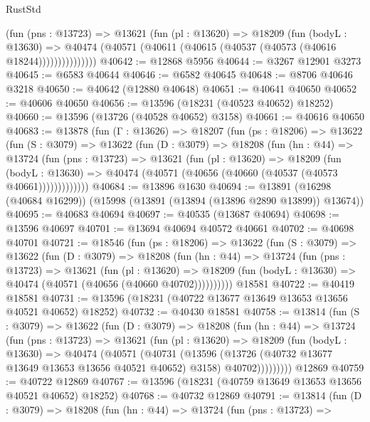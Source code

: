 \begin{lexlean}{RustStd}
\begin{coremodule}
                (fun (pns : @13723) =>
                @13621
                  (fun (pl : @13620) =>
                  @18209
                    (fun (bodyL : @13630) =>
                    @40474 (@40571 (@40611 (@40615 (@40537 (@40573 (@40616 @18244)))))))))))))))
@40642 := @12868 @5956
@40644 := @3267 @12901 @3273
@40645 := @6583 @40644
@40646 := @6582 @40645
@40648 := @8706 @40646 @3218
@40650 := @40642 (@12880 @40648)
@40651 := @40641 @40650
@40652 := @40606 @40650
@40656 := @13596 (@18231 (@40523 @40652) @18252)
@40660 := @13596 (@13726 (@40528 @40652) @3158)
@40661 := @40616 @40650
@40683 := @13878
    (fun (Γ : @13626) =>
    @18207
      (fun (ps : @18206) =>
      @13622
        (fun (S : @3079) =>
        @13622
          (fun (D : @3079) =>
          @18208
            (fun (hn : @44) =>
            @13724
              (fun (pns : @13723) =>
              @13621
                (fun (pl : @13620) =>
                @18209
                  (fun (bodyL : @13630) =>
                  @40474 (@40571 (@40656 (@40660 (@40537 (@40573 @40661)))))))))))))
@40684 := @13896 @1630
@40694 := @13891 (@16298 (@40684 @16299)) (@15998 (@13891 (@13894 (@13896 @2890 @13899)) @13674))
@40695 := @40683 @40694
@40697 := @40535 (@13687 @40694)
@40698 := @13596 @40697
@40701 := @13694 @40694 @40572 @40661
@40702 := @40698 @40701
@40721 := @18546
    (fun (ps : @18206) =>
    @13622
      (fun (S : @3079) =>
      @13622
        (fun (D : @3079) =>
        @18208
          (fun (hn : @44) =>
          @13724
            (fun (pns : @13723) =>
            @13621
              (fun (pl : @13620) =>
              @18209 (fun (bodyL : @13630) => @40474 (@40571 (@40656 (@40660 @40702))))))))))
    @18581
@40722 := @40419 @18581
@40731 := @13596 (@18231 (@40722 @13677 @13649 @13653 @13656 @40521 @40652) @18252)
@40732 := @40430 @18581
@40758 := @13814
    (fun (S : @3079) =>
    @13622
      (fun (D : @3079) =>
      @18208
        (fun (hn : @44) =>
        @13724
          (fun (pns : @13723) =>
          @13621
            (fun (pl : @13620) =>
            @18209
              (fun (bodyL : @13630) =>
              @40474
                (@40571
                  (@40731
                    (@13596
                      (@13726 (@40732 @13677 @13649 @13653 @13656 @40521 @40652) @3158)
                      @40702)))))))))
    @12869
@40759 := @40722 @12869
@40767 := @13596 (@18231 (@40759 @13649 @13653 @13656 @40521 @40652) @18252)
@40768 := @40732 @12869
@40791 := @13814
    (fun (D : @3079) =>
    @18208
      (fun (hn : @44) =>
      @13724
        (fun (pns : @13723) =>

\end{coremodule}
\end{lexlean}
